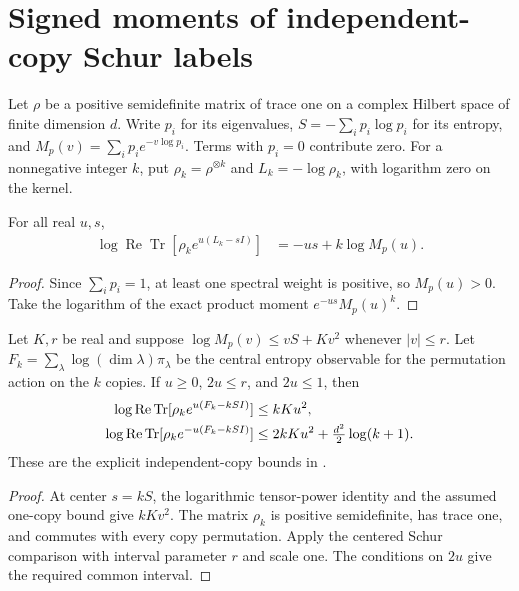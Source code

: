 \section{Signed moments of independent-copy Schur labels}

Let $\rho$ be a positive semidefinite matrix of trace one on a complex
Hilbert space of finite dimension $d$. Write $p_i$ for its eigenvalues,
$S=-\sum_i p_i\log p_i$ for its entropy, and
$M_p(v)=\sum_i p_i e^{-v\log p_i}$. Terms with $p_i=0$ contribute zero.
For a nonnegative integer $k$, put $\rho_k=\rho^{\otimes k}$ and
$L_k=-\log\rho_k$, with logarithm zero on the kernel.

\begin{theorem}
  \label{thm:iid_log_surprisal_moment}
  \leanok
  For all real $u,s$,
  \begin{align}
    \log\operatorname{Re}\operatorname{Tr}
      [\rho_k e^{u(L_k-sI)}]
      &=-us+k\log M_p(u).
  \end{align}
\end{theorem}
\begin{proof}\leanok
  Since $\sum_i p_i=1$, at least one spectral weight is positive, so
  $M_p(u)>0$. Take the logarithm of the exact product moment
  $e^{-us}M_p(u)^k$.
\end{proof}

\begin{theorem}
  \label{thm:iid_signed_schur_moments}
  \leanok
  Let $K,r$ be real and suppose
  $\log M_p(v)\leq vS+Kv^2$ whenever $|v|\leq r$.
  Let $F_k=\sum_\lambda\log(\dim\lambda)\pi_\lambda$ be the
  central entropy observable for the permutation action on the $k$ copies.
  If $u\geq0$, $2u\leq r$, and $2u\leq1$, then
  \begin{align}
    \log\operatorname{Re}\operatorname{Tr}
      [\rho_k e^{u(F_k-kSI)}]&\leq kKu^2,\notag\\
    \log\operatorname{Re}\operatorname{Tr}
      [\rho_k e^{-u(F_k-kSI)}]&\leq 2kKu^2+\tfrac{d^2}{2}\log(k+1).
  \end{align}
  These are the explicit independent-copy bounds in
  \cite[Section~8]{OpenAI2026AreaLaw}.
\end{theorem}
\begin{proof}\leanok
  At center $s=kS$, the logarithmic tensor-power identity and the
  assumed one-copy bound give $kKv^2$. The matrix $\rho_k$ is positive semidefinite,
  has trace one, and commutes with every copy permutation. Apply the
  centered Schur comparison with interval parameter $r$ and scale one.
  The conditions on $2u$ give the required common interval.
\end{proof}
